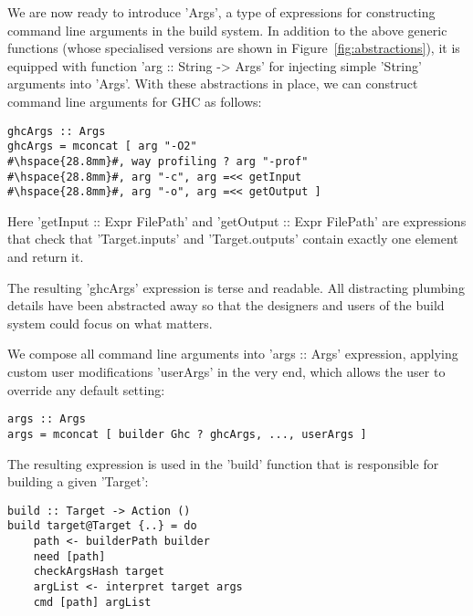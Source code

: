 We are now ready to introduce \lst'Args', a type of expressions for
constructing command line arguments in the build system. In addition to the
above generic functions (whose specialised versions are shown in
Figure~\ref{fig:abstractions}), it is equipped with function
\lst'arg :: String -> Args' for injecting simple \lst'String' arguments into
\lst'Args'. With these abstractions in place, we can construct command line
arguments for GHC as follows:

\begin{lstlisting}
ghcArgs :: Args
ghcArgs = mconcat [ arg "-O2"
#\hspace{28.8mm}#, way profiling ? arg "-prof"
#\hspace{28.8mm}#, arg "-c", arg =<< getInput
#\hspace{28.8mm}#, arg "-o", arg =<< getOutput ]
\end{lstlisting}

\noindent Here \lst'getInput :: Expr FilePath' and
\lst'getOutput :: Expr FilePath' are expressions that check that
\lst'Target.inputs' and \lst'Target.outputs' contain exactly one element and
return it.

The resulting \lst'ghcArgs' expression is terse and readable. All
distracting plumbing details have been abstracted away so that the designers and
users of the build system could focus on what matters. 

We compose all command line arguments into \lst'args :: Args' expression,
applying custom user modifications \lst'userArgs' in the very end, which
allows the user to override any default setting:

\begin{lstlisting}
args :: Args
args = mconcat [ builder Ghc ? ghcArgs, ..., userArgs ]
\end{lstlisting}

The resulting expression is used in the \lst'build' function that is responsible
for building a given \lst'Target':

\begin{lstlisting}
build :: Target -> Action ()
build target@Target {..} = do
    path <- builderPath builder
    need [path]
    checkArgsHash target
    argList <- interpret target args
    cmd [path] argList
\end{lstlisting}


